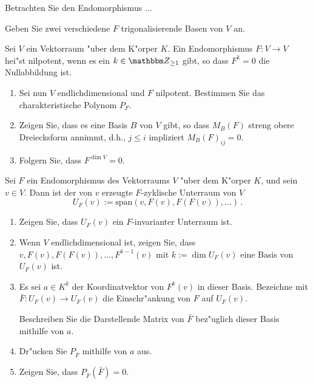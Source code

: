 \documentclass[a4,11pt]{article}
\begin{document}
\vspace*{-17mm}
{
\kopf
}


\begin{aufgabe}[4 Punkte]
  Betrachten Sie den Endomorphismus ...

  Geben Sie zwei verschiedene $F$ trigonalisierende Basen von $V$ an.
\end{aufgabe}

\begin{aufgabe}[4 Punkte]
  Sei $V$ ein Vektorraum "uber dem K"orper
  $K$. Ein Endomorphismus $F \colon V \to V$ hei"st nilpotent, wenn es
  ein $k \in \Z_{\ge 1}$ gibt, so dass $F^k=0$ die Nullabbildung ist.

\begin{enumerate}
\item Sei nun $V$ endlichdimensional und $F$ nilpotent. Bestimmen Sie
  das charakteristische Polynom $P_F$.
\item Zeigen Sie, dass es eine Basis $B$ von $V$ gibt, so dass
  $M_B(F)$ streng obere Dreiecksform annimmt, d.h., $j \leq i$ impliziert $M_B(F)_{ij} = 0$.
\item Folgern Sie, dass $F^{\dim V} = 0$.
\end{enumerate}

\end{aufgabe}

\begin{aufgabe}[4 Punkte]
Sei $F$ ein Endomorphismus des Vektorraums $V$ "uber dem K"orper $K$,
und sein $v \in V$.
Dann ist der von $v$ erzeugte $F$-zyklische Unterraum von $V$
$$ U_F(v) := \text{span}(v, F(v), F(F(v)), \ldots) \,.$$
  
  \begin{enumerate}
  \item Zeigen Sie, dass $U_F(v)$ ein $F$-invarianter Unterraum ist.
  \item Wenn $V$ endlichdimensional ist, zeigen Sie, dass $v, F(v),
    F(F(v)), \ldots, F^{k-1}(v)$ mit $k := \dim U_F(v)$ eine
    Basis von $U_F(v)$ ist. 
  \item Es sei $a \in K^k$ der Koordinatvektor von $F^k(v)$ in dieser Basis.
    Bezeichne mit $\bar F \colon U_F(v) \to U_F(v)$ die 
    Einschr"ankung von $F$ auf $U_F(v)$.
    
    Beschreiben Sie die Darstellende Matrix von $\bar F$ bez"uglich
    dieser Basis mithilfe von $a$.
  \item Dr"ucken Sie $P_{\bar F}$ mithilfe von $a$ aus.
  \item Zeigen Sie, dass $P_{\bar F}(\bar F) = 0$.
\end{enumerate}

\end{aufgabe}
\end{document}
